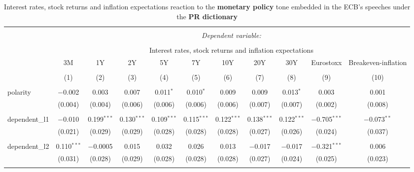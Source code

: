 
\begin{table}[!htbp] \centering 
  \caption[PR Monetary Policy Tone \& Interest Rates, Stock Returns, Inflation Expectations: all speeches]{Interest rates, stock returns and inflation expectations reaction to the \textbf{monetary policy} tone embedded in the ECB's speeches under the \textbf{PR dictionary}} 
  \label{tab:assets_all_pr_mp} 
  \begin{adjustbox}{width=1.25\textwidth}
\begin{tabular}{@{\extracolsep{5pt}}lcccccccccc} 
\\[-1.8ex]\hline 
\hline \\[-1.8ex] 
 & \multicolumn{10}{c}{\textit{Dependent variable:}} \\ 
\cline{2-11} 
\\[-1.8ex] & \multicolumn{10}{c}{Interest rates, stock returns and inflation expectations} \\ 
 & 3M & 1Y & 2Y & 5Y & 7Y & 10Y & 20Y & 30Y & Eurostoxx & Breakeven-inflation \\ 
\\[-1.8ex] & (1) & (2) & (3) & (4) & (5) & (6) & (7) & (8) & (9) & (10)\\ 
\hline \\[-1.8ex] 
 polarity & $-$0.002 & 0.003 & 0.007 & 0.011$^{*}$ & 0.010$^{*}$ & 0.009 & 0.009 & 0.013$^{*}$ & 0.003 & 0.001 \\ 
  & (0.004) & (0.004) & (0.006) & (0.006) & (0.006) & (0.006) & (0.007) & (0.007) & (0.002) & (0.008) \\ 
  & & & & & & & & & & \\ 
 dependent\_l1 & $-$0.010 & 0.199$^{***}$ & 0.130$^{***}$ & 0.109$^{***}$ & 0.115$^{***}$ & 0.122$^{***}$ & 0.138$^{***}$ & 0.122$^{***}$ & $-$0.705$^{***}$ & $-$0.073$^{**}$ \\ 
  & (0.021) & (0.029) & (0.029) & (0.028) & (0.028) & (0.028) & (0.027) & (0.026) & (0.024) & (0.037) \\ 
  & & & & & & & & & & \\ 
 dependent\_l2 & 0.110$^{***}$ & $-$0.0005 & 0.015 & 0.032 & 0.026 & 0.013 & $-$0.017 & $-$0.017 & $-$0.321$^{***}$ & 0.006 \\ 
  & (0.031) & (0.028) & (0.029) & (0.028) & (0.028) & (0.028) & (0.027) & (0.024) & (0.025) & (0.023) \\ 
  & & & & & & & & & & \\ 

\end{tabular}
\end{adjustbox}
\end{table}
